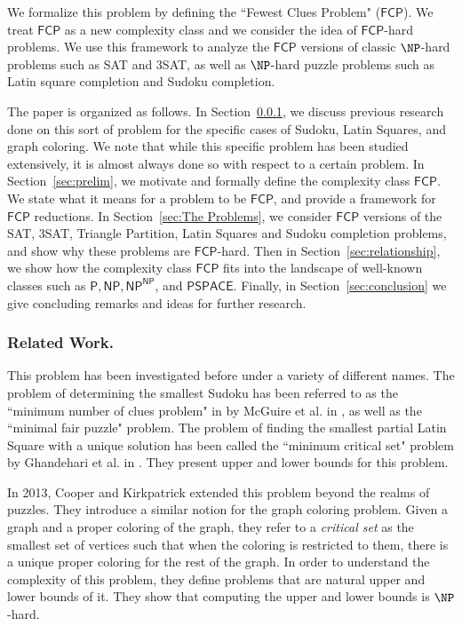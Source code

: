 \documentclass[runningheads,a4paper]{llncs}
\begin{document}
We formalize this problem by defining the ``Fewest Clues Problem" ($\mathsf{FCP}$). We treat $\mathsf{FCP}$ as a new complexity class and we consider the idea of $\mathsf{FCP}$-hard problems. We use this framework to analyze the $\mathsf{FCP}$ versions of classic $\NP$-hard problems such as SAT and 3SAT, as well as $\NP$-hard puzzle problems such as Latin square completion and Sudoku completion. 

The paper is organized as follows. In Section~\ref{sec:related}, we discuss previous research done on this sort of problem for the specific cases of Sudoku, Latin Squares, and graph coloring. We note that while this specific problem has been studied extensively, it is almost always done so with respect to a certain problem. In Section~\ref{sec:prelim}, we motivate and formally define the complexity class $\mathsf{FCP}$. We state what it means for a problem to be $\mathsf{FCP}$, and provide a framework for $\mathsf{FCP}$ reductions. In Section~\ref{sec:The Problems}, we consider $\mathsf{FCP}$ versions of the SAT, 3SAT, Triangle Partition, Latin Squares and Sudoku completion problems, and show why these problems are $\mathsf{FCP}$-hard. Then in Section~\ref{sec:relationship}, we show how the complexity class $\mathsf{FCP}$ fits into the landscape of well-known classes such as $\mathsf{P}, \mathsf{NP}, \mathsf{NP}^\mathsf{NP}$, and $\mathsf{PSPACE}$. Finally, in Section~\ref{sec:conclusion} we give concluding remarks and ideas for further research.


\subsubsection{Related Work.}
\label{sec:related}

This problem has been investigated before under a variety of different names. The problem of determining the smallest Sudoku has been referred to as the ``minimum number of clues problem" in
by McGuire et al. in \cite{mcguire2012there}, as well as the ``minimal fair puzzle" problem. The problem of finding the smallest partial Latin Square with a unique solution has been called the ``minimum critical set" problem by Ghandehari et al. in \cite{Ghandehari2005121}. They present upper and lower bounds for this problem. 

In 2013, Cooper and Kirkpatrick \cite{Cooper:2014:CSS:2612293.2612628} extended this problem beyond the realms of puzzles. They introduce a similar notion for the graph coloring problem. Given a graph and a proper coloring of the graph, they refer to a \emph{critical set} as the smallest set of vertices such that when the coloring is restricted to them, there is a unique proper coloring for the rest of the graph. In order to understand the complexity of this problem, they define problems that are natural upper and lower bounds of it. They show that computing the upper and lower bounds is $\NP$-hard. 
\end{document}
